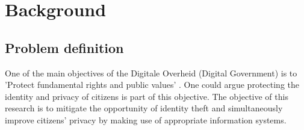 \chapter{Background}\label{s:background}
\section{Problem definition}
One of the main objectives of the Digitale Overheid (Digital Government) is to 'Protect fundamental rights and public values' \cite{DO_agenda}. One could argue protecting the identity and privacy of citizens is part of this objective. The objective of this research is to mitigate the opportunity of identity theft and simultaneously improve citizens’ privacy by making use of appropriate information systems.

